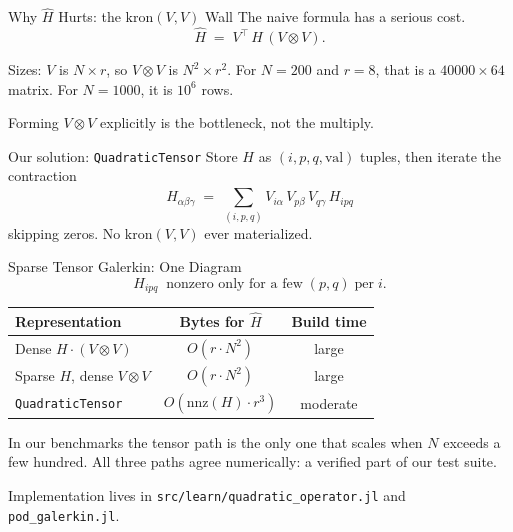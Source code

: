 \documentclass[aspectratio=169,10pt]{beamer}
\begin{document}
\begin{frame}{Why $\widehat{H}$ Hurts: the $\mathrm{kron}(V, V)$ Wall}
  The naive formula has a serious cost.
  \[
    \widehat{H} \;=\; V^{\top}\, H\, (V \otimes V).
  \]

  \medskip
  Sizes: $V$ is $N \times r$, so $V \otimes V$ is $N^2 \times r^2$. For $N = 200$ and $r = 8$, that is a $40000 \times 64$ matrix. For $N = 1000$, it is $10^6$ rows.

  \medskip
  Forming $V \otimes V$ explicitly is the bottleneck, not the multiply.

  \medskip
  \begin{block}{Our solution: \texttt{QuadraticTensor}}
    Store $H$ as $(i, p, q, \text{val})$ tuples, then iterate the contraction
    \[
      \widehat{H}_{\alpha \beta \gamma} \;=\; \sum_{(i, p, q)} V_{i \alpha}\, V_{p \beta}\, V_{q \gamma}\, H_{ipq}
    \]
    skipping zeros. No $\mathrm{kron}(V, V)$ ever materialized.
  \end{block}
\end{frame}

\begin{frame}{Sparse Tensor Galerkin: One Diagram}
  \[
    H_{ipq}\;\;\text{nonzero only for a few}\;(p,q)\;\text{per}\;i.
  \]

  \begin{center}
    \begin{tabular}{lcc}
      \toprule
      Representation             & Bytes for $\widehat{H}$ & Build time \\
      \midrule
      Dense $H \cdot (V \otimes V)$  & $O(r \cdot N^2)$  &  large \\
      Sparse $H$, dense $V \otimes V$ & $O(r \cdot N^2)$  &  large \\
      \texttt{QuadraticTensor}        & $O(\mathrm{nnz}(H) \cdot r^3)$ & moderate \\
      \bottomrule
    \end{tabular}
  \end{center}

  \medskip
  In our benchmarks the tensor path is the only one that scales when $N$ exceeds a few hundred. All three paths agree numerically: a verified part of our test suite.

  \medskip
  Implementation lives in \texttt{src/learn/quadratic\_operator.jl} and \texttt{pod\_galerkin.jl}.
\end{frame}
\end{document}
